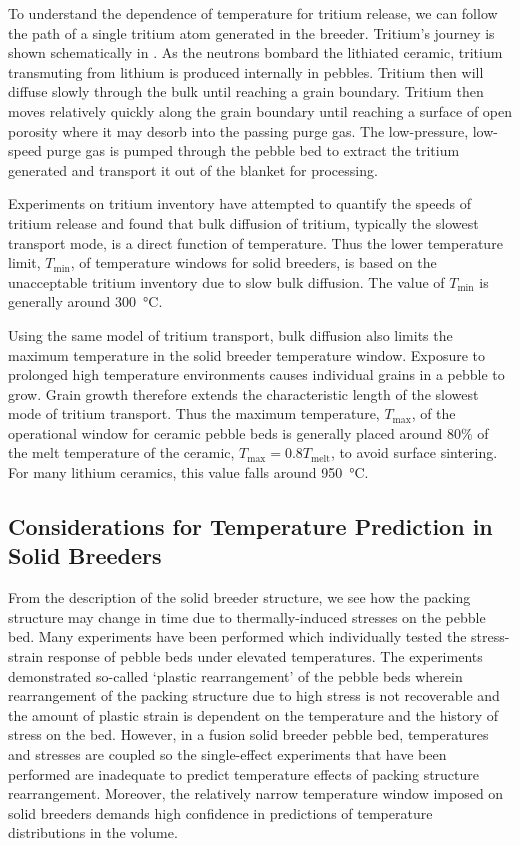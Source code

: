 To understand the dependence of temperature for tritium release, we can follow the path of a single tritium atom generated in the breeder. Tritium's journey is shown schematically in . As the neutrons bombard the lithiated ceramic, tritium transmuting from lithium is produced internally in pebbles. Tritium then will diffuse slowly through the bulk until reaching a grain boundary. Tritium then moves relatively quickly along the grain boundary until reaching a surface of open porosity where it may desorb into the passing purge gas.\cite{Federici1990} The low-pressure, low-speed purge gas is pumped through the pebble bed to extract the tritium generated and transport it out of the blanket for processing.

Experiments on tritium inventory have attempted to quantify the speeds of tritium release and found that bulk diffusion of tritium, typically the slowest transport mode, is a direct function of temperature.\cite{Franza2013} Thus the lower temperature limit, $T_\text{min}$, of temperature windows for solid breeders, is based on the unacceptable tritium inventory due to slow bulk diffusion. The value of $T_\text{min}$ is generally around \SI{300}{\celsius}.

Using the same model of tritium transport, bulk diffusion also limits the maximum temperature in the solid breeder temperature window. Exposure to prolonged high temperature environments causes individual grains in a pebble to grow. Grain growth therefore extends the characteristic length of the slowest mode of tritium transport. Thus the maximum temperature, $T_\text{max}$, of the operational window for ceramic pebble beds is generally placed around 80\% of the melt temperature of the ceramic, $T_\text{max} = 0.8 T_\text{melt}$, to avoid surface sintering. For many lithium ceramics, this value falls around \SI{950}{\celsius}.

\subsection{Considerations for Temperature Prediction in Solid Breeders}
From the description of the solid breeder structure, we see how the packing structure may change in time due to thermally-induced stresses on the pebble bed. Many experiments have been performed which individually tested the stress-strain response of pebble beds under elevated temperatures. The experiments demonstrated so-called `plastic rearrangement' of the pebble beds wherein rearrangement of the packing structure due to high stress is not recoverable and the amount of plastic strain is dependent on the temperature and the history of stress on the bed. However, in a fusion solid breeder pebble bed, temperatures and stresses are coupled so the single-effect experiments that have been performed are inadequate to predict temperature effects of packing structure rearrangement. Moreover, the relatively narrow temperature window imposed on solid breeders demands high confidence in predictions of temperature distributions in the volume.







